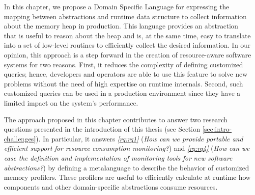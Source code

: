 In this chapter, we propose a Domain Specific Language for expressing the mapping between abstractions and runtime data structure to collect information about the memory heap in production.
This language provides an abstraction that is useful to reason about the heap and is, at the same time, easy to translate into a set of low-level routines to efficiently collect the desired information.
In our opinion, this approach is a step forward in the creation of resource-aware software systems for two reasons. 
First, it reduces the complexity of defining customized queries; hence, developers and operators are able to use this feature to solve new problems without the need of high expertise on runtime internals.
Second, such customized queries can be used in a production environment since they have a limited impact on the system's performance.

The approach proposed in this chapter contributes to answer two research questions presented in the introduction of this thesis (see Section \ref{sec:intro-challenges}).
In particular, it answers \textit{\ref{rq:rq1}} (\textit{How can we provide portable and efficient support for resource consumption monitoring?}) and \textit{\ref{rq:rq4}} (\textit{How can we ease the definition and implementation of monitoring tools for new software abstractions?}) by defining a metalanguage to describe the behavior of customized memory profilers.
These profilers are useful to efficiently calculate at runtime how components and other domain-specific abstractions consume resources. 
